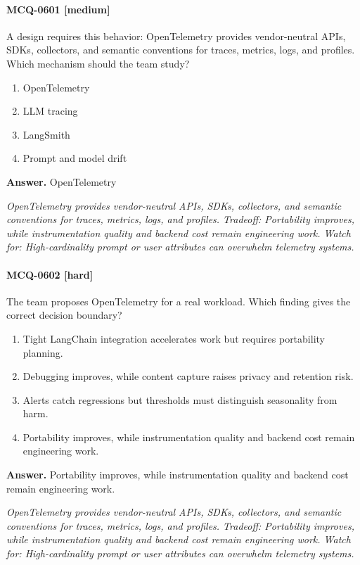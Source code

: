 \paragraph{MCQ-0601 [medium]} A design requires this behavior: OpenTelemetry provides vendor-neutral APIs, SDKs, collectors, and semantic conventions for traces, metrics, logs, and profiles. Which mechanism should the team study?
\begin{enumerate}[label=\Alph*.]
\item OpenTelemetry
\item LLM tracing
\item LangSmith
\item Prompt and model drift
\end{enumerate}
\noindent\textbf{Answer.} OpenTelemetry
\par\textit{OpenTelemetry provides vendor-neutral APIs, SDKs, collectors, and semantic conventions for traces, metrics, logs, and profiles. Tradeoff: Portability improves, while instrumentation quality and backend cost remain engineering work. Watch for: High-cardinality prompt or user attributes can overwhelm telemetry systems.}
\paragraph{MCQ-0602 [hard]} The team proposes OpenTelemetry for a real workload. Which finding gives the correct decision boundary?
\begin{enumerate}[label=\Alph*.]
\item Tight LangChain integration accelerates work but requires portability planning.
\item Debugging improves, while content capture raises privacy and retention risk.
\item Alerts catch regressions but thresholds must distinguish seasonality from harm.
\item Portability improves, while instrumentation quality and backend cost remain engineering work.
\end{enumerate}
\noindent\textbf{Answer.} Portability improves, while instrumentation quality and backend cost remain engineering work.
\par\textit{OpenTelemetry provides vendor-neutral APIs, SDKs, collectors, and semantic conventions for traces, metrics, logs, and profiles. Tradeoff: Portability improves, while instrumentation quality and backend cost remain engineering work. Watch for: High-cardinality prompt or user attributes can overwhelm telemetry systems.}
